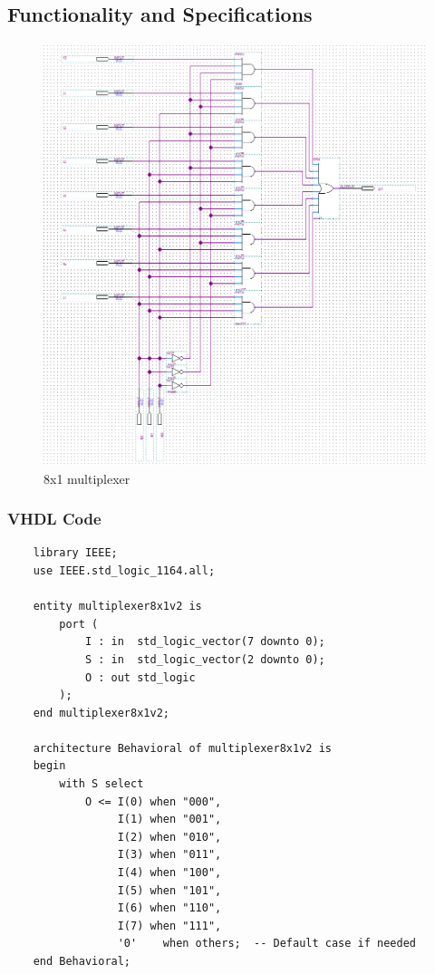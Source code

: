 \documentclass[12pt]{article}
\begin{document}
\subsection{Functionality and Specifications}
\begin{figure}[h]
\caption{8x1 multiplexer}
\centering
\includegraphics[width=\textwidth]{./diagrams/8x1multiplexer.png}
\end{figure}

\clearpage
\subsubsection{VHDL Code}

\begin{verbatim}
    library IEEE;
    use IEEE.std_logic_1164.all;
    
    entity multiplexer8x1v2 is
        port (
            I : in  std_logic_vector(7 downto 0);
            S : in  std_logic_vector(2 downto 0);
            O : out std_logic
        );
    end multiplexer8x1v2;
    
    architecture Behavioral of multiplexer8x1v2 is
    begin
        with S select
            O <= I(0) when "000",
                 I(1) when "001",
                 I(2) when "010",
                 I(3) when "011",
                 I(4) when "100",
                 I(5) when "101",
                 I(6) when "110",
                 I(7) when "111",
                 '0'    when others;  -- Default case if needed
    end Behavioral;
\end{verbatim}
\clearpage
\end{document}
